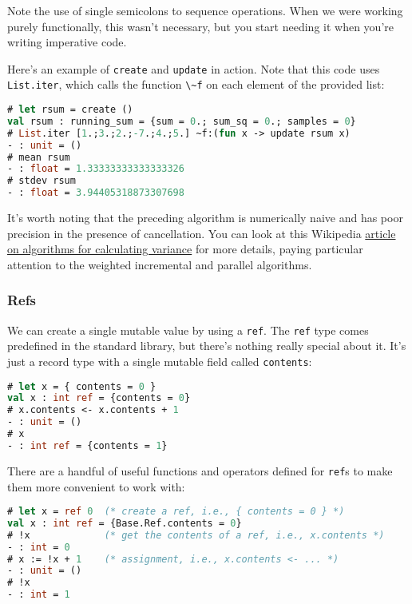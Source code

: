 Note the use of single semicolons to sequence operations. When we were
working purely functionally, this wasn't necessary, but you start
needing it when you're writing imperative code.

Here's an example of \passthrough{\lstinline!create!} and
\passthrough{\lstinline!update!} in action. Note that this code uses
\passthrough{\lstinline!List.iter!}, which calls the function
\passthrough{\lstinline!\~f!} on each element of the provided list:

\begin{lstlisting}[language=Caml]
# let rsum = create ()
val rsum : running_sum = {sum = 0.; sum_sq = 0.; samples = 0}
# List.iter [1.;3.;2.;-7.;4.;5.] ~f:(fun x -> update rsum x)
- : unit = ()
# mean rsum
- : float = 1.33333333333333326
# stdev rsum
- : float = 3.94405318873307698
\end{lstlisting}

It's worth noting that the preceding algorithm is numerically naive and
has poor precision in the presence of cancellation. You can look at this
Wikipedia
\href{http://en.wikipedia.org/wiki/Algorithms_for_calculating_variance}{article
on algorithms for calculating variance} for more details, paying
particular attention to the weighted incremental and parallel
algorithms.

\hypertarget{refs}{%
\subsubsection{Refs}\label{refs}}

We can create a single mutable value by using a
\passthrough{\lstinline!ref!}. The \passthrough{\lstinline!ref!} type
comes predefined in the standard library, but there's nothing really
special about it. It's just a record type with a single mutable field
called
\passthrough{\lstinline!contents!}:

\begin{lstlisting}[language=Caml]
# let x = { contents = 0 }
val x : int ref = {contents = 0}
# x.contents <- x.contents + 1
- : unit = ()
# x
- : int ref = {contents = 1}
\end{lstlisting}

There are a handful of useful functions and operators defined for
\passthrough{\lstinline!ref!}s to make them more convenient to work
with:

\begin{lstlisting}[language=Caml]
# let x = ref 0  (* create a ref, i.e., { contents = 0 } *)
val x : int ref = {Base.Ref.contents = 0}
# !x             (* get the contents of a ref, i.e., x.contents *)
- : int = 0
# x := !x + 1    (* assignment, i.e., x.contents <- ... *)
- : unit = ()
# !x
- : int = 1
\end{lstlisting}

